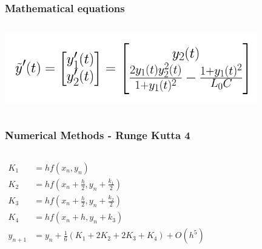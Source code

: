 \documentclass[aspectratio=1610]{beamer}
\begin{document}
\begin{frame}
\frametitle{Mathematical equations}
\begin{columns}
\column{37em}
\hspace*{2cm}\includegraphics[width=11cm]{figs/2nd ode.png}
\end{columns}
\end{frame}
\begin{frame}
\frametitle{Numerical Methods - Runge Kutta 4}
\begin{columns}
\column{2em}
  \begin{align*}
  K_{1}&=hf(x_{n},y_{n})\\
  K_{2}&=hf(x_{n}+\frac{h}{2},y_{n}+\frac{k_{1}}{2})\\
  K_{3}&=hf(x_{n}+\frac{h}{2},y_{n}+\frac{k_{2}}{2})\\
  K_{4}&=hf(x_{n}+h,y_{n}+k_{3})\\
  y_{n+1}&=y_{n}+\frac{1}{6}\left(K_{1}+2K_{2}+2K_{3}+K_{4}\right)+O(h^{5})
  \end{align*}
\end{columns}
\end{frame}
\end{document}
